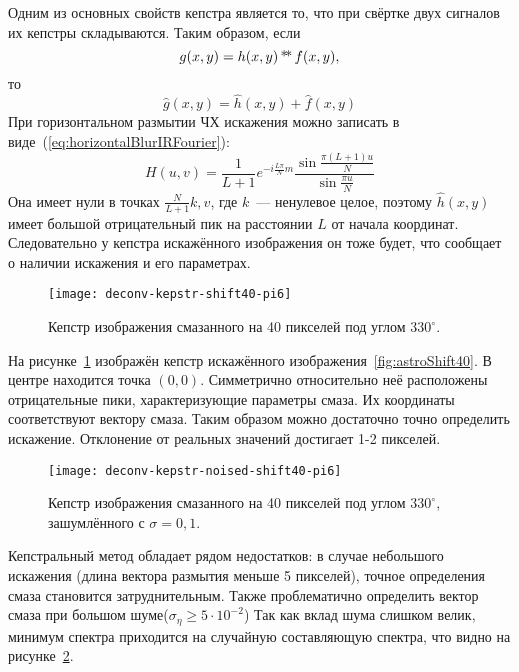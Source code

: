 Одним из основных свойств кепстра является то, что при свёртке двух сигналов их кепстры складываются. Таким образом, если
\begin{equation}
	g(x,y) = h(x,y) \operatorname*{*\!*} f(x,y),
\end{equation}
то \cite{iterableImageRestorationBiemonLangdeik}
\begin{equation}\label{eq:kepstrSum}
	\hat{g}(x,y) = \hat{h}(x,y) + \hat{f}(x,y)
\end{equation}
При горизонтальном размытии ЧХ искажения можно записать в виде~(\ref{eq:horizontalBlurIRFourier}):
\begin{equation*}
H(u,v) =       
\frac{1}{L+1}e^{-i\frac{L\pi}{N}m}\frac{\sin\frac{\pi(L+1)u}{N}}{\sin\frac{\pi u}{N}}
\end{equation*}
Она имеет нули в точках $\frac{N}{L+1}k, v$, где $k$~--- ненулевое целое, поэтому $\hat{h}(x,y)$ имеет большой отрицательный пик на расстоянии $L$ от начала координат. Следовательно у кепстра искажённого изображения он тоже будет, что сообщает о наличии искажения и его параметрах.
\begin{figure}[h!]
	\centerline{\texttt{[image: deconv-kepstr-shift40-pi6]}}
	\caption{Кепстр изображения смазанного на 40 пикселей под углом $330^{\circ}$.}
	\label{fig:kepstr}
\end{figure}

На рисунке~\ref{fig:kepstr} изображён кепстр искажённого изображения~\ref{fig:astroShift40}. В центре находится точка $(0,0)$. Симметрично относительно неё расположены отрицательные пики, характеризующие параметры смаза. Их координаты соответствуют вектору смаза.
Таким образом можно достаточно точно определить искажение. Отклонение от реальных значений достигает 1-2 пикселей.

\begin{figure}[h!]
	\centerline{\texttt{[image: deconv-kepstr-noised-shift40-pi6]}}
	\caption{Кепстр изображения смазанного на 40 пикселей под углом $330^{\circ}$, зашумлённого с $\sigma=0,1$.}
	\label{fig:kepstrNoised}
\end{figure}
Кепстральный метод обладает рядом недостатков: в случае небольшого искажения (длина вектора размытия меньше 5 пикселей), точное определения смаза становится затруднительным. Также проблематично определить вектор смаза при большом шуме($\sigma_\eta \geq 5\cdot 10^{-2}$)\cite{panfilovaThesis} Так как вклад шума слишком велик, минимум спектра приходится на случайную составляющую спектра, что видно на рисунке~\ref{fig:kepstrNoised}.

